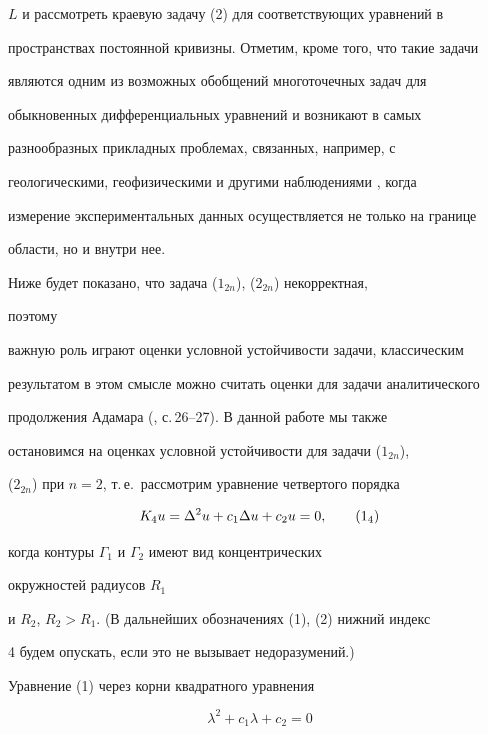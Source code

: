 $L$ и рассмотреть краевую задачу (2) для соответствующих уравнений в 


пространствах постоянной кривизны. Отметим, кроме того, что такие задачи 


являются одним из возможных обобщений многоточечных задач для 


обыкновенных дифференциальных уравнений и возникают в самых 


разнообразных прикладных проблемах, связанных, например, с 


геологическими, геофизическими и другими наблюдениями \cite{4}, когда 


измерение экспериментальных данных осуществляется не только на границе 


области, но и внутри нее. 


 


Ниже будет показано, что задача ($1_{2n}$), ($2_{2n}$) некорректная, 


поэтому 


важную роль играют оценки условной устойчивости задачи, классическим 


результатом в этом смысле можно считать оценки для задачи аналитического 


продолжения Адамара (\cite{4}, с.\,26--27). В данной работе мы также 


остановимся на оценках условной устойчивости для задачи ($1_{2n}$), 


($2_{2n}$) при $n=2$, т.\,е.~рассмотрим уравнение четвертого порядка 


\begin{equation} 


K_4u=\Delta^2u+c_1\Delta u+c_2u=0,\tag{1${}_4$} 


\end{equation} 


когда контуры $\Gamma_1$ и $\Gamma_2$ имеют вид концентрических 


окружностей радиусов $R_1$ 


и $R_2$, $R_2>R_1$. (В дальнейших обозначениях (1), (2) нижний индекс 


4 будем опускать, если это не вызывает недоразумений.) 


 


Уравнение (1) через корни квадратного уравнения 


\addtocounter{equation}{2}


\begin{equation} 


\lambda^2+c_1\lambda+c_2=0 


\end{equation} 



